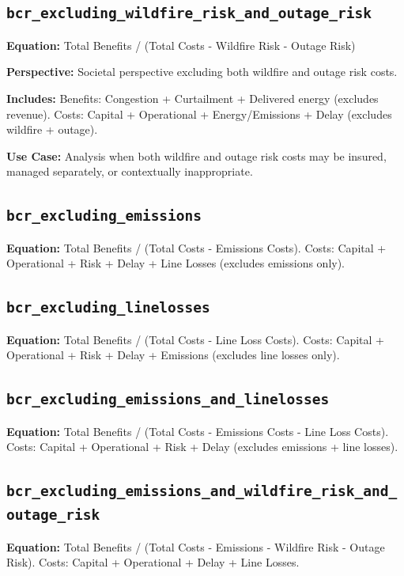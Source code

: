 \documentclass[ctcc_full_documentation.tex]{subfiles}
\begin{document}
\subsection{\texttt{bcr\_excluding\_wildfire\_risk\_and\_outage\_risk}}

\textbf{Equation:} Total Benefits / (Total Costs - Wildfire Risk - Outage Risk)

\textbf{Perspective:} Societal perspective excluding both wildfire and outage risk costs.

\textbf{Includes:} Benefits: Congestion + Curtailment + Delivered energy (excludes revenue). Costs: Capital + Operational + Energy/Emissions + Delay (excludes wildfire + outage).

\textbf{Use Case:} Analysis when both wildfire and outage risk costs may be insured, managed separately, or contextually inappropriate.

\subsection{\texttt{bcr\_excluding\_emissions}}

\textbf{Equation:} Total Benefits / (Total Costs - Emissions Costs). Costs: Capital + Operational + Risk + Delay + Line Losses (excludes emissions only).

\subsection{\texttt{bcr\_excluding\_linelosses}}

\textbf{Equation:} Total Benefits / (Total Costs - Line Loss Costs). Costs: Capital + Operational + Risk + Delay + Emissions (excludes line losses only).

\subsection{\texttt{bcr\_excluding\_emissions\_and\_linelosses}}

\textbf{Equation:} Total Benefits / (Total Costs - Emissions Costs - Line Loss Costs). Costs: Capital + Operational + Risk + Delay (excludes emissions + line losses).

\subsection{\texttt{bcr\_excluding\_emissions\_and\_wildfire\_risk\_and\_outage\_risk}}

\textbf{Equation:} Total Benefits / (Total Costs - Emissions - Wildfire Risk - Outage Risk). Costs: Capital + Operational + Delay + Line Losses.
\end{document}
